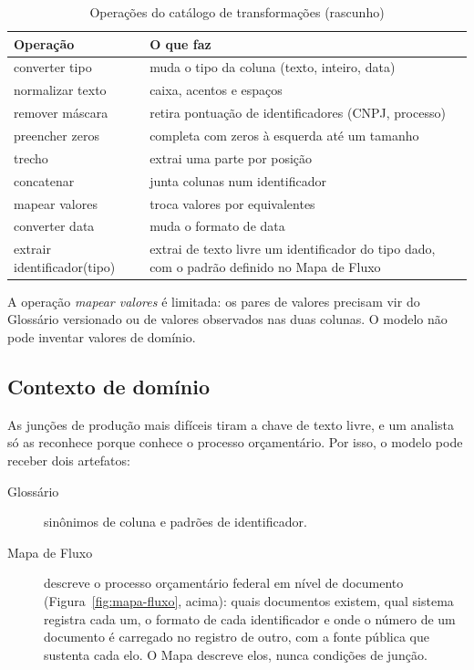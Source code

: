 \begin{table}[htbp]
\centering
\caption{Operações do catálogo de transformações (rascunho)}
\label{tab:catalogo}
\footnotesize
\begin{tabularx}{\textwidth}{@{}l>{\raggedright\arraybackslash}X@{}}
\toprule
\textbf{Operação} & \textbf{O que faz} \\
\midrule
converter tipo & muda o tipo da coluna (texto, inteiro, data) \\
normalizar texto & caixa, acentos e espaços \\
remover máscara & retira pontuação de identificadores (CNPJ, processo) \\
preencher zeros & completa com zeros à esquerda até um tamanho \\
trecho & extrai uma parte por posição \\
concatenar & junta colunas num identificador \\
mapear valores & troca valores por equivalentes \\
converter data & muda o formato de data \\
extrair identificador(tipo) & extrai de texto livre um identificador do tipo dado, com o padrão definido no Mapa de Fluxo \\
\bottomrule
\end{tabularx}
\end{table}

A operação \emph{mapear valores} é limitada: os pares de valores precisam vir
do Glossário versionado ou de valores observados nas duas colunas. O modelo
não pode inventar valores de domínio.

\subsection{Contexto de domínio}
\label{sec:arquitetura-contexto}

As junções de produção mais difíceis tiram a chave de texto livre, e um
analista só as reconhece porque conhece o processo orçamentário. Por isso, o
modelo pode receber dois artefatos:

\begin{description}
\item[Glossário] sinônimos de coluna e padrões de identificador.
\item[Mapa de Fluxo] descreve o processo orçamentário federal em nível de
documento (Figura~\ref{fig:mapa-fluxo}, acima): quais documentos existem,
qual sistema registra cada um, o formato de cada identificador e onde o
número de um documento é carregado no registro de outro, com a fonte pública
que sustenta cada elo. O Mapa descreve elos, nunca condições de junção.
\end{description}

